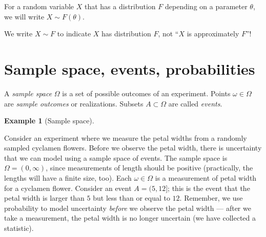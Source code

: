 \documentclass[
  a4paper,
  oneside]{book}
\theoremstyle{definition}
\theoremstyle{definition}
\newtheorem{example}{Example}[chapter]
\theoremstyle{definition}
\theoremstyle{plain}
\theoremstyle{remark}
\begin{document}
For a random variable \(X\) that has a distribution \(F\) depending on a
parameter \(\theta\), we will write \(X \sim F(\theta)\).

\begin{tcolorbox}[enhanced jigsaw, colframe=quarto-callout-warning-color-frame, breakable, toprule=.15mm, bottomrule=.15mm, title=\textcolor{quarto-callout-warning-color}{\faExclamationTriangle}\hspace{0.5em}{Warning}, arc=.35mm, opacityback=0, left=2mm, opacitybacktitle=0.6, bottomtitle=1mm, toptitle=1mm, titlerule=0mm, rightrule=.15mm, colback=white, colbacktitle=quarto-callout-warning-color!10!white, coltitle=black, leftrule=.75mm]

We write \(X \sim F\) to indicate \(X\) has distribution \(F\), not
``\(X\) is approximately \(F\)''!

\end{tcolorbox}

\section*{Sample space, events,
probabilities}\label{sample-space-events-probabilities}


A \emph{sample space} \(\Omega\) is a set of possible outcomes of an
experiment. Points \(\omega \in \Omega\) are \emph{sample outcomes} or
realizations. Subsets \(A \subset \Omega\) are called \emph{events}.

\begin{example}[Sample
space]\protect\hypertarget{exm-sample-space}{}\label{exm-sample-space}

Consider an experiment where we measure the petal widths from a randomly
sampled cyclamen flowers. Before we observe the petal width, there is
uncertainty that we can model using a sample space of events. The sample
space is \(\Omega = (0, \infty)\), since measurements of length should
be positive (practically, the lengths will have a finite size, too).
Each \(\omega \in \Omega\) is a measurement of petal width for a
cyclamen flower. Consider an event \(A = (5, 12]\); this is the event
that the petal width is larger than \(5\) but less than or equal to
\(12\). Remember, we use probability to model uncertainty \emph{before}
we observe the petal width --- after we take a measurement, the petal
width is no longer uncertain (we have collected a statistic).

\end{example}
\end{document}
